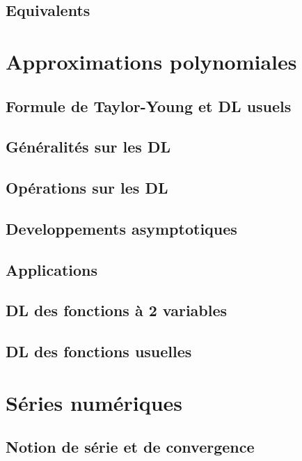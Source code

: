 \documentclass[11pt,twoside,a4paper]{article}
\begin{document}
\subsection{Equivalents}

\newpage
\section{Approximations polynomiales}

\subsection{Formule de Taylor-Young et DL usuels}

\subsection{Généralités sur les DL}

\subsection{Opérations sur les DL}

\subsection{Developpements asymptotiques}

\subsection{Applications}

\subsection{DL des fonctions à 2 variables}

\subsection{DL des fonctions usuelles}

\newpage
\section{Séries numériques}

\subsection{Notion de série et de convergence}
\end{document}
